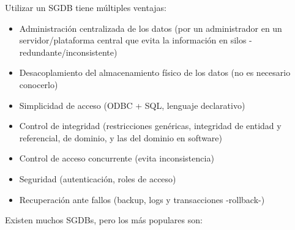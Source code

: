 \documentclass[
]{book}
\providecommand{\tightlist}{%
  \setlength{\itemsep}{0pt}\setlength{\parskip}{0pt}}
\theoremstyle{break}
\theoremstyle{nonumberplain}
\begin{document}
Utilizar un SGDB tiene múltiples ventajas:

\begin{itemize}
\tightlist
\item
  Administración centralizada de los datos (por un administrador en un servidor/plataforma central que evita la información en silos -redundante/inconsistente)
\item
  Desacoplamiento del almacenamiento físico de los datos (no es necesario conocerlo)
\item
  Simplicidad de acceso (ODBC + SQL, lenguaje declarativo)
\item
  Control de integridad (restricciones genéricas, integridad de entidad y referencial, de dominio, y las del dominio en software)
\item
  Control de acceso concurrente (evita inconsistencia)
\item
  Seguridad (autenticación, roles de acceso)
\item
  Recuperación ante fallos (backup, logs y transacciones -rollback-)
\end{itemize}

Existen muchos SGDBs, pero los más populares son:
\end{document}
